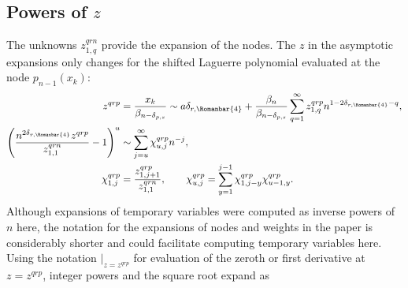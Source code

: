 \documentclass[11pt]{article}
\newcommand*{\todo}[1]{{\color{red}?? TODO: #1 ??}}
\newcommand{\qg}{q}
\newcommand{\rg}{r}
\newcommand{\rl}{{\scriptsize \Romanbar{4}} }
\newcommand{\pg}{p}
\newcommand{\pn}{n}
\newcommand{\ps}{s}
\numberwithin{equation}{section}
\begin{document}


\subsection{Powers of $z$}

The unknowns $z_{1,q}^{\qg\rg\pn}$ provide the expansion of the nodes. The $z$ in the asymptotic expansions only changes for the shifted Laguerre polynomial %
evaluated at the node $p_{n-1}(x_k)$: 
\begin{align}
	z^{\qg\rg\pg} & = \frac{x_k}{\beta_{n-\delta_{\pg,\ps} }} \sim a\delta_{\rg, \rl} + %
\frac{\beta_n}{\beta_{n-\delta_{\pg,\ps}}} \sum_{q=1}^\infty z_{1,q}^{\qg\rg\pg} n^{ 1 -2\delta_{\rg,\rl} -q}, \label{Eexpzgen} \\
	\left(\frac{n^{2\delta_{\rg,\rl} } z^{\qg\rg\pg} }{z_{1,1}^{\qg\rg\pn}} -1\right)^u & \sim \sum_{j=u}^\infty \chi_{u,j}^{\qg\rg\pg} n^{-j}, \\
	\chi_{1,j}^{\qg\rg\pg} & = \frac{z_{1,j+1}^{\qg\rg\pg} }{z_{1,1}^{\qg\rg\pn}}, \qquad \chi_{u,j}^{\qg\rg\pg}  = \sum_{y=1}^{j-1} \chi_{1,j-y}^{\qg\rg\pg} \chi_{u-1,y}^{\qg\rg\pg}.
\end{align}
Although expansions of temporary variables were computed as inverse powers of $n$ here, the notation for the expansions of nodes and weights in the paper is considerably shorter and could facilitate computing temporary variables here. %
Using the notation $|_{z=z^{\qg\rg\pg}}$ for evaluation of the zeroth or first derivative at $z=z^{\qg\rg\pg}$, integer %
powers and the square root expand as
\end{document}
